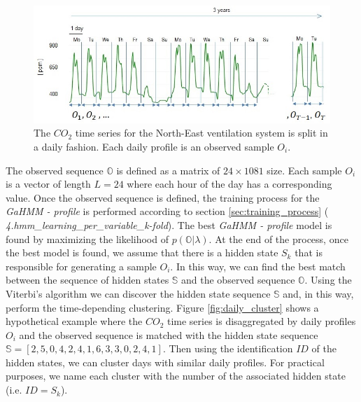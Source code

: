 \begin{figure}[h!]
  \vspace{0.5em} %
  \includegraphics[scale=0.7]{Figures/split_time_series.jpg}
  \caption{ The $CO_2$ time series for the North-East ventilation system is split in a daily fashion. Each daily profile is an observed sample $O_i$.}
  \label{fig:daily_split}
\end{figure}

The observed sequence $\mathbb{O}$ is defined as a matrix of $24 \times 1081$ size. Each sample $O_i$ is a vector of length $L=24$ where each hour of the day has a corresponding value. Once the observed sequence is defined, the training process for the \textit{GaHMM - profile} is performed according to section \ref{sec:training_process} (\textit{ 4.hmm\_learning\_per\_variable\_k-fold}). The best \textit{GaHMM - profile} model is found by maximizing the likelihood of $p(\mathbb{O}|\lambda)$. At the end of the process, once the best model is found, we assume that there is a hidden state $S_k$ that is responsible for generating a sample $O_i$. In this way, we can find the best match between the sequence of hidden states $\mathbb{S}$ and the observed sequence $\mathbb{O}$. Using the Viterbi's algorithm we can discover the hidden state sequence $\mathbb{S}$ and, in this way, perform the time-depending clustering. Figure \ref{fig:daily_cluster} shows a hypothetical example where the $CO_2$ time series is disaggregated by daily profiles $O_i$ and the observed sequence is matched with the hidden state sequence $\mathbb{S} = [2,5,0,4,2,4,1,6,3,3,0,2,4,1]$. Then using the identification $ID$ of the hidden states, we can cluster days with similar daily profiles. For practical purposes, we name each cluster with the number of the associated hidden state (i.e. $ID = S_k$).  


